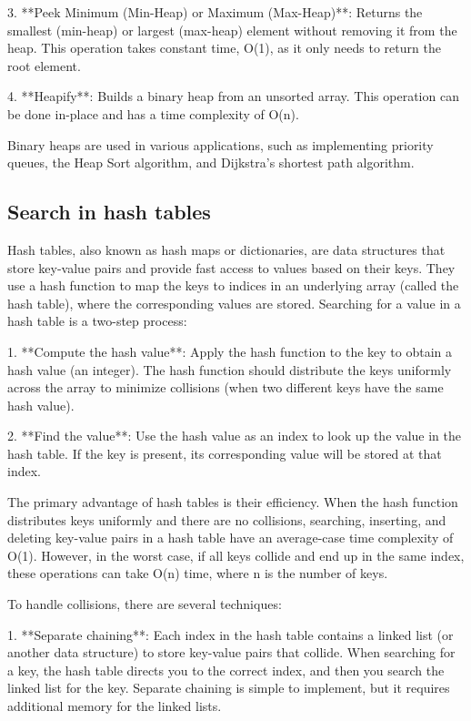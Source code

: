 \documentclass{article}
\begin{document}
3. **Peek Minimum (Min-Heap) or Maximum (Max-Heap)**: Returns the smallest (min-heap) or largest (max-heap) element without removing it from the heap. This operation takes constant time, O(1), as it only needs to return the root element.

4. **Heapify**: Builds a binary heap from an unsorted array. This operation can be done in-place and has a time complexity of O(n).

Binary heaps are used in various applications, such as implementing priority queues, the Heap Sort algorithm, and Dijkstra's shortest path algorithm.


\subsection{Search in hash tables}

Hash tables, also known as hash maps or dictionaries, are data structures that store key-value pairs and provide fast access to values based on their keys. They use a hash function to map the keys to indices in an underlying array (called the hash table), where the corresponding values are stored. Searching for a value in a hash table is a two-step process:

1. **Compute the hash value**: Apply the hash function to the key to obtain a hash value (an integer). The hash function should distribute the keys uniformly across the array to minimize collisions (when two different keys have the same hash value).

2. **Find the value**: Use the hash value as an index to look up the value in the hash table. If the key is present, its corresponding value will be stored at that index.

The primary advantage of hash tables is their efficiency. When the hash function distributes keys uniformly and there are no collisions, searching, inserting, and deleting key-value pairs in a hash table have an average-case time complexity of O(1). However, in the worst case, if all keys collide and end up in the same index, these operations can take O(n) time, where n is the number of keys.

To handle collisions, there are several techniques:

1. **Separate chaining**: Each index in the hash table contains a linked list (or another data structure) to store key-value pairs that collide. When searching for a key, the hash table directs you to the correct index, and then you search the linked list for the key. Separate chaining is simple to implement, but it requires additional memory for the linked lists.
\end{document}
